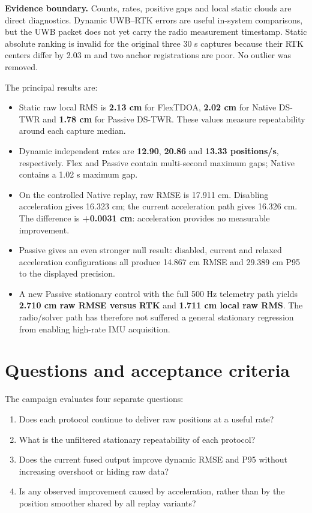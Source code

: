 \documentclass[10pt,a4paper]{article}
\begin{document}
\colorbox{info}{\parbox{0.96\textwidth}{\textbf{Evidence boundary.}
Counts, rates, positive gaps and local static clouds are direct diagnostics.
Dynamic UWB--RTK errors are useful in-system comparisons, but the UWB packet
does not yet carry the radio measurement timestamp. Static absolute ranking is
invalid for the original three 30 s captures because their RTK centers differ
by 2.03 m and two anchor registrations are poor. No outlier was removed.}}

The principal results are:
\begin{itemize}
\item Static raw local RMS is \textbf{2.13 cm} for FlexTDOA,
      \textbf{2.02 cm} for Native DS-TWR and \textbf{1.78 cm} for Passive
      DS-TWR. These values measure repeatability around each capture median.
\item Dynamic independent rates are \textbf{12.90}, \textbf{20.86} and
      \textbf{13.33 positions/s}, respectively. Flex and Passive contain
      multi-second maximum gaps; Native contains a 1.02 s maximum gap.
\item On the controlled Native replay, raw RMSE is 17.911 cm. Disabling
      acceleration gives 16.323 cm; the current acceleration path gives
      16.326 cm. The difference is \textbf{+0.0031 cm}: acceleration provides
      no measurable improvement.
\item Passive gives an even stronger null result: disabled, current and
      relaxed acceleration configurations all produce 14.867 cm RMSE and
      29.389 cm P95 to the displayed precision.
\item A new Passive stationary control with the full 500 Hz telemetry path
      yields \textbf{2.710 cm raw RMSE versus RTK} and \textbf{1.711 cm local
      raw RMS}. The radio/solver path has therefore not suffered a general
      stationary regression from enabling high-rate IMU acquisition.
\end{itemize}

\section{Questions and acceptance criteria}

The campaign evaluates four separate questions:
\begin{enumerate}
\item Does each protocol continue to deliver raw positions at a useful rate?
\item What is the unfiltered stationary repeatability of each protocol?
\item Does the current fused output improve dynamic RMSE and P95 without
      increasing overshoot or hiding raw data?
\item Is any observed improvement caused by acceleration, rather than by the
      position smoother shared by all replay variants?
\end{enumerate}
\end{document}
